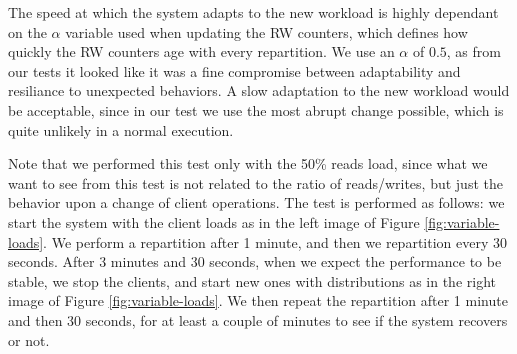 The speed at which the system adapts to the new workload is highly dependant on the $\alpha$ variable used when updating the RW counters, which defines how quickly the RW counters age with every repartition. We use an $\alpha$ of $0.5$, as from our tests it looked like it was a fine compromise between adaptability and resiliance to unexpected behaviors. A slow adaptation to the new workload would be acceptable, since in our test we use the most abrupt change possible, which is quite unlikely in a normal execution.

Note that we performed this test only with the 50\% reads load, since what we want to see from this test is not related to the ratio of reads/writes, but just the behavior upon a change of client operations. The test is performed as follows: we start the system with the client loads as in the left image of Figure \ref{fig:variable-loads}. We perform a repartition after 1 minute, and then we repartition every 30 seconds. After 3 minutes and 30 seconds, when we expect the performance to be stable, we stop the clients, and start new ones with distributions as in the right image of Figure \ref{fig:variable-loads}. We then repeat the repartition after 1 minute and then 30 seconds, for at least a couple of minutes to see if the system recovers or not. 

